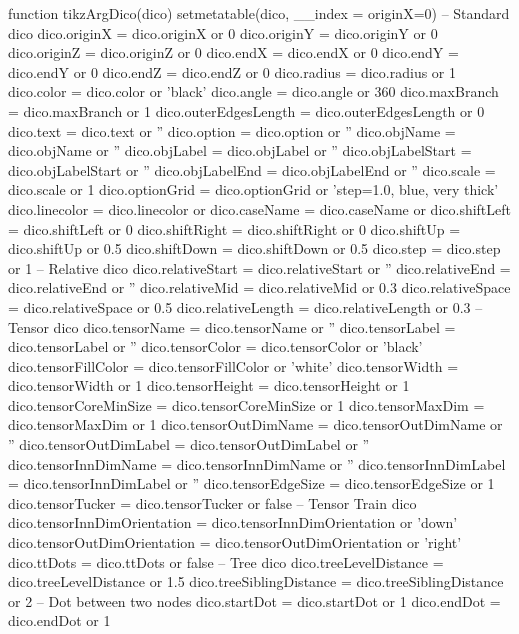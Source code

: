 \begin{luacode*}
{{{	function tikzArgDico(dico)
		setmetatable(dico, {__index = {originX=0}})
		-- Standard dico
		 dico.originX 		 	= dico.originX or 0
	  	 dico.originY 		 	= dico.originY or 0
		 dico.originZ 		 	= dico.originZ or 0
		 dico.endX 			 	= dico.endX or 0
		 dico.endY 			 	= dico.endY or 0
		 dico.endZ 			 	= dico.endZ or 0
	  	 dico.radius 		 	= dico.radius or 1
		 dico.color 		 	= dico.color or 'black'
	  	 dico.angle 		 	= dico.angle or 360
	  	 dico.maxBranch 	 	= dico.maxBranch or 1
	  	 dico.outerEdgesLength  = dico.outerEdgesLength or 0
		 dico.text 			 	= dico.text or ''
		 dico.option 		 	= dico.option or ''
		 dico.objName 		 	= dico.objName or ''
		 dico.objLabel 	 		= dico.objLabel or ''
		 dico.objLabelStart 	= dico.objLabelStart or ''
		 dico.objLabelEnd 	 	= dico.objLabelEnd or ''
		 dico.scale 		 	= dico.scale or 1
		 dico.optionGrid 		= dico.optionGrid or 'step=1.0, blue, very thick'
		 dico.linecolor 		= dico.linecolor or {}
		 dico.caseName 		 	= dico.caseName or {}
		 dico.shiftLeft 	 	= dico.shiftLeft or 0
		 dico.shiftRight 	 	= dico.shiftRight or 0
		 dico.shiftUp 		 	= dico.shiftUp or 0.5
		 dico.shiftDown 	 	= dico.shiftDown or 0.5
		 dico.step 			 	= dico.step or 1
		-- Relative dico
		 dico.relativeStart 	= dico.relativeStart or ''
		 dico.relativeEnd 	 	= dico.relativeEnd or ''
		 dico.relativeMid 	 	= dico.relativeMid or 0.3
		 dico.relativeSpace 	= dico.relativeSpace or 0.5
		 dico.relativeLength 	= dico.relativeLength or 0.3
		-- Tensor dico
		 dico.tensorName 	 	= dico.tensorName or ''
		 dico.tensorLabel 	 	= dico.tensorLabel or ''
		 dico.tensorColor 	 	= dico.tensorColor or 'black'
		 dico.tensorFillColor 	= dico.tensorFillColor or 'white'
		 dico.tensorWidth 	 	= dico.tensorWidth or 1
		 dico.tensorHeight 	 	= dico.tensorHeight or 1
		 dico.tensorCoreMinSize = dico.tensorCoreMinSize or 1
		 dico.tensorMaxDim 	 	= dico.tensorMaxDim or 1
		 dico.tensorOutDimName 	= dico.tensorOutDimName or ''
		 dico.tensorOutDimLabel = dico.tensorOutDimLabel or ''
		 dico.tensorInnDimName 	= dico.tensorInnDimName or ''
		 dico.tensorInnDimLabel = dico.tensorInnDimLabel or ''
		 dico.tensorEdgeSize 	= dico.tensorEdgeSize or 1
		 dico.tensorTucker 	 	= dico.tensorTucker or false
		-- Tensor Train dico
		 dico.tensorInnDimOrientation = dico.tensorInnDimOrientation or 'down'
		 dico.tensorOutDimOrientation = dico.tensorOutDimOrientation or 'right'
		 dico.ttDots 				  = dico.ttDots or false
		-- Tree dico
		 dico.treeLevelDistance   = dico.treeLevelDistance or 1.5
		 dico.treeSiblingDistance = dico.treeSiblingDistance or 2
		-- Dot between two nodes
		 dico.startDot = dico.startDot or 1
		 dico.endDot   = dico.endDot or 1

}}}
\end{luacode*}
